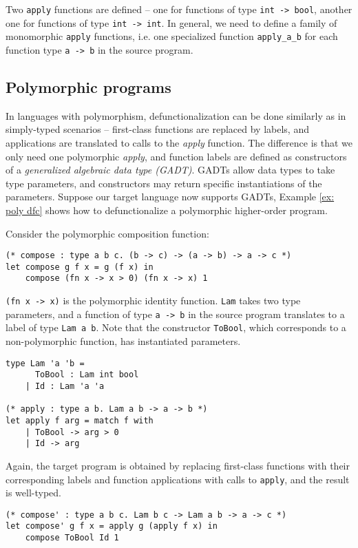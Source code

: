Two \texttt{apply} functions are defined – one for functions of type \texttt{int -> bool}, another one for functions of type \texttt{int -> int}. In general, we need to define a family of monomorphic \texttt{apply} functions, i.e. one specialized function \texttt{apply\_a\_b} for each function type \texttt{a -> b} in the source program.

\subsection{Polymorphic programs}

In languages with polymorphism, defunctionalization can be done similarly as in simply-typed scenarios – first-class functions are replaced by labels, and applications are translated to calls to the \textit{apply} function. The difference is that we only need one polymorphic \textit{apply}, and function labels are defined as constructors of a  \textit{generalized algebraic data type (GADT)}. GADTs allow data types to take type parameters, and constructors may return specific instantiations of the parameters. Suppose our target language now supports GADTs, Example \ref{ex: poly dfc} shows how to defunctionalize a polymorphic higher-order program.

\begin{exmp} Consider the polymorphic composition function:
\begin{lstlisting}
(* compose : type a b c. (b -> c) -> (a -> b) -> a -> c *)
let compose g f x = g (f x) in
    compose (fn x -> x > 0) (fn x -> x) 1
\end{lstlisting}
\texttt{(fn x -> x)} is the polymorphic identity function. \texttt{Lam} takes two type parameters, and a function of type \texttt{a -> b} in the source program translates to a label of type \texttt{Lam a b}. Note that the constructor \texttt{ToBool}, which corresponds to a non-polymorphic function, has instantiated parameters. 
\begin{lstlisting}
type Lam 'a 'b = 
	  ToBool : Lam int bool
	| Id : Lam 'a 'a

(* apply : type a b. Lam a b -> a -> b *)
let apply f arg = match f with
	| ToBool -> arg > 0
	| Id -> arg
\end{lstlisting}
Again, the target program is obtained by replacing first-class functions with their corresponding labels and function applications with calls to \texttt{apply}, and the result is well-typed.
\begin{lstlisting}
(* compose' : type a b c. Lam b c -> Lam a b -> a -> c *)
let compose' g f x = apply g (apply f x) in
    compose ToBool Id 1
\end{lstlisting}
	\label{ex: poly dfc}
\end{exmp}

